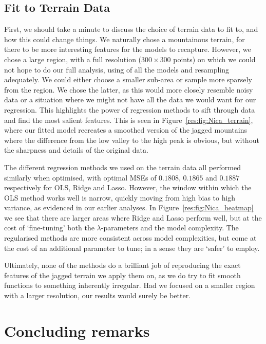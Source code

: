 \documentclass[twocolumn,english,notitlepage]{article}
\begin{document}
        \subsection{Fit to Terrain Data}
            First, we should take a minute to discuss the choice of terrain data to fit to, and how this could change things. We naturally chose a mountainous terrain, for there to be more interesting features for the models to recapture. However, we chose a large region, with a full resolution ($300\times 300$ points) on which we could not hope to do our full analysis, using of all the models and resampling adequately. We could either choose a smaller sub-area or sample more sparsely from the region. We chose the latter, as this would more closely resemble noisy data or a situation where we might not have all the data we would want for our regression. This highlights the power of regression methods to sift through data and find the most salient features. This is seen in Figure~\ref{res:fig:Nica_terrain}, where our fitted model recreates a smoothed version of the jagged mountains where the difference from the low valley to the high peak is obvious, but without the sharpness and details of the original data.

            The different regression methods we used on the terrain data all performed similarly when optimised, with optimal MSEs of $0.1808$, $0.1865$ and $0.1887$ respectively for OLS, Ridge and Lasso. However, the window within which the OLS method works well is narrow, quickly moving from high bias to high variance, as evidenced in our earlier analyses. In Figure~\ref{res:fig:Nica_heatmap} we see that there are larger areas where Ridge and Lasso perform well, but at the cost of `fine-tuning' both the $\lambda$-parameters and the model complexity. The regularised methods are more consistent across model complexities, but come at the cost of an additional parameter to tune; in a sense they are `safer' to employ.

            Ultimately, none of the methods do a brilliant job of reproducing the exact features of the jagged terrain we apply them on, as we do try to fit smooth functions to something inherently irregular. Had we focused on a smaller region with a larger resolution, our results would surely be better.


\section{Concluding remarks}
\end{document}
